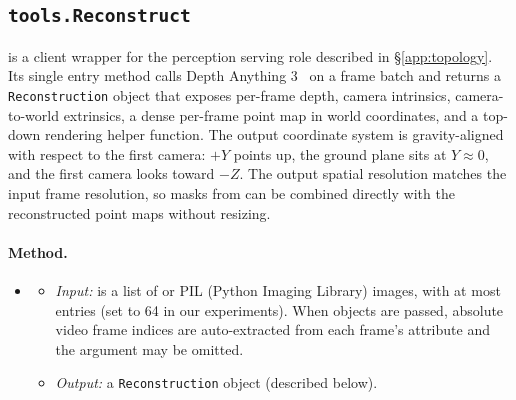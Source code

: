 \subsection{\texttt{tools.Reconstruct}}
\label{app:tool_reconstruct}
 is a client wrapper for the perception serving role described in \S\ref{app:topology}. Its single entry method calls Depth Anything 3~\citep{depthanything3} on a frame batch and returns a \texttt{Reconstruction} object that exposes per-frame depth, camera intrinsics, camera-to-world extrinsics, a dense per-frame point map in world coordinates, and a top-down rendering helper function. The output coordinate system is gravity-aligned with respect to the first camera: $+Y$ points up, the ground plane sits at $Y \approx 0$, and the first camera looks toward $-Z$. The output spatial resolution matches the input frame resolution, so masks from  can be combined directly with the reconstructed point maps without resizing.

\paragraph{Method.}
\begin{itemize}[leftmargin=1.5em]
\item {}
  \begin{itemize}
  \item \emph{Input:}  is a list of  or PIL (Python Imaging Library) images, with at most  entries (set to 64 in our experiments). When  objects are passed, absolute video frame indices are auto-extracted from each frame's  attribute and the  argument may be omitted.
  \item \emph{Output:} a \texttt{Reconstruction} object (described below).
  \end{itemize}
\end{itemize}

